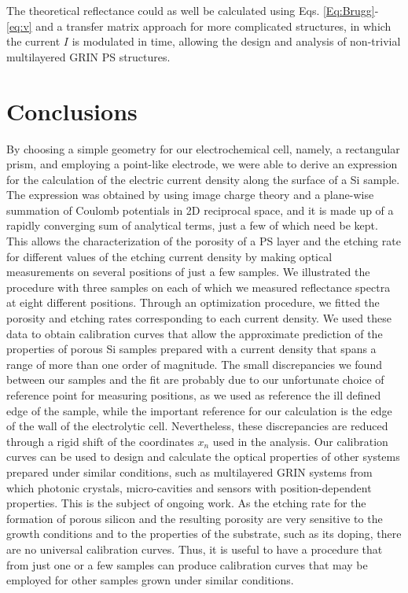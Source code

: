 \documentclass[review,sort&compress]{cas-sc}
\begin{document}
The theoretical reflectance could as well be calculated using Eqs.
\eqref{Eq:Brugg}-\eqref{eq:v} and a transfer matrix approach for more
complicated structures, in which the
current $I$ is modulated in time, allowing the design and analysis of
non-trivial multilayered GRIN PS structures.


\section{Conclusions}
\label{sec:conclusions}
By choosing a simple geometry for our electrochemical cell, namely, a
rectangular prism, and employing a point-like electrode, we were able
to derive an expression for the calculation of the electric current
density along the surface of a Si sample. The expression was obtained
by using image charge theory and a plane-wise summation of Coulomb
potentials in 2D reciprocal space, and it is made up of
a rapidly converging sum of analytical terms, just a few of which
need be kept. This allows the characterization
of the porosity of a PS layer and the etching
rate for different values of the etching current density by making
optical measurements on several positions of just a
few samples. We illustrated the procedure with three samples on each of which we
measured reflectance spectra at eight different positions.
Through an optimization procedure, we fitted the porosity and etching
rates corresponding to each current density. We used these data to
obtain calibration curves that allow the approximate prediction of the
properties of porous Si samples prepared with a current density that
spans a range of more than one order of magnitude. The
small discrepancies we found between our samples and the fit
are probably due to our unfortunate choice of reference point for
measuring positions, as we used as reference the ill defined edge of
the sample, while the important reference for our calculation is the
edge of the wall of the electrolytic cell. Nevertheless, these
discrepancies are reduced through a rigid shift of the coordinates
$x_n$ used in the analysis. Our calibration curves can be used to
design and calculate the optical
properties of other systems prepared under similar conditions, such as
multilayered GRIN systems from which photonic crystals, micro-cavities
and sensors with position-dependent properties. This is the subject of
ongoing work. As the etching rate for the formation of porous silicon
and the resulting porosity are very sensitive to the growth conditions
and to the properties of the substrate, such as its doping,
there are no universal calibration curves. Thus, it is useful to have
a procedure that from just one or a few samples can produce calibration curves
that may be employed for other samples grown under similar conditions.
\end{document}
